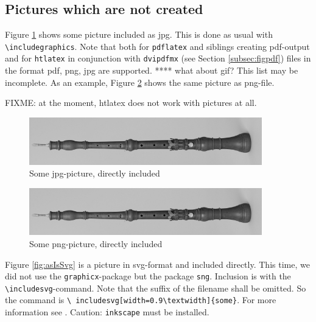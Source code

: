 \documentclass[12pt]{article}
\begin{document}
\subsection{Pictures which are not created}\label{subsec:picasis}

Figure \ref{fig:asIsJpg} shows some picture included as jpg. 
This is done as usual with {\tt\textbackslash includegraphics}. 
Note that both for {\tt pdflatex} and siblings creating pdf-output 
and for {\tt htlatex} in conjunction with {\tt dvipdfmx} 
(see Section \ref{subsec:figpdf}) 
files in the format pdf, \gls{png}, \gls{jpg} are supported. 
 **** what about \gls{gif}? 
This list may be incomplete. 
As an example, Figure \ref{fig:asIsPng} shows the same picture 
as png-file. 

FIXME: at the moment, htlatex does not work with pictures at all. 

\begin{figure}[htb]
\begin{center}
\includegraphics[width=0.9\textwidth]{06someJpgOboeBaroqueDennerMIR370.jpg}%
\end{center}
\caption{\label{fig:asIsJpg}Some jpg-picture, directly included }
\end{figure}

\begin{figure}[htb]
\begin{center}
\includegraphics[width=0.9\textwidth]{07somePngOboeBaroqueDennerMIR370.png}%
\end{center}
\caption{\label{fig:asIsPng}Some png-picture, directly included }
\end{figure}


Figure \ref{fig:asIsSvg} is a picture in \gls{svg}-format 
and included directly. 
This time, we did not use the {\tt graphicx}-package 
but the package {\tt sng}. 
Inclusion is with the {\tt\textbackslash includesvg}-command. 
Note that the suffix of the filename shall be omitted. 
So the command is {\tt \textbackslash
includesvg[width=0.9\textbackslash textwidth]\{some\}}. 
For more information see \cite{SvgP}. 
Caution: {\tt inkscape} must be installed. 
\end{document}
